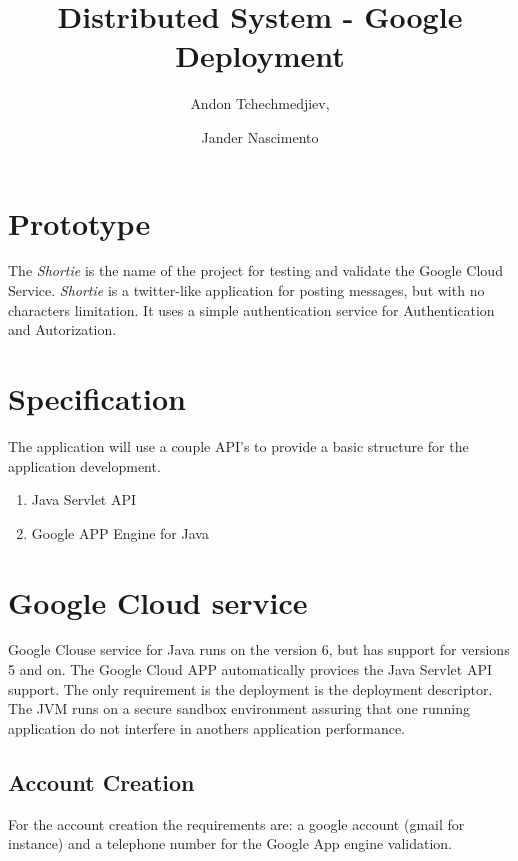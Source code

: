 \documentclass{article}
\begin{document}
\title{Distributed System - Google Deployment}

\author{Andon Tchechmedjiev, 
\and Jander Nascimento}

\maketitle

\section{Prototype}

The \emph{Shortie} is the name of the project for testing and validate the Google Cloud Service.
\emph{Shortie} is a twitter-like application for posting messages, but with no characters limitation. It uses a simple authentication service for Authentication and Autorization.

\section{Specification}

The application will use a couple API's to provide a basic structure for the application development.

\begin{enumerate}
\item Java Servlet API
\item Google APP Engine for Java
\end{enumerate}

\section{Google Cloud service}

Google Clouse service for Java runs on the version 6, but has support for versions 5 and on. The Google Cloud APP automatically provices the Java Servlet API support.
The only requirement is the deployment is the deployment descriptor. 
The JVM runs on a secure sandbox environment assuring that one running application do not interfere in anothers application performance.

\subsection{Account Creation}

For the account creation the requirements are: a google account (gmail for instance) and a telephone number for the Google App engine validation.
\end{document}
